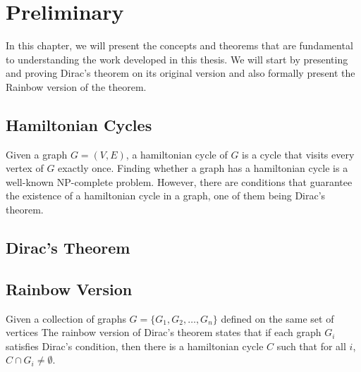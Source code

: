 
\chapter{Preliminary}

In this chapter, we will present the concepts and theorems that are fundamental to understanding the 
work developed in this thesis. We will start by presenting and proving Dirac's theorem on its original
version and also formally present the Rainbow version of the theorem.

\section{Hamiltonian Cycles}

Given a graph $G = (V, E)$, a hamiltonian cycle of $G$ is a cycle that visits every vertex of $G$ exactly once.
Finding whether a graph has a hamiltonian cycle is a well-known NP-complete problem. 
However, there are conditions that guarantee the existence of a hamiltonian cycle in a graph, one of them being Dirac's theorem.

\section{Dirac's Theorem}

\section{Rainbow Version}

Given a collection of graphs  $G = \{G_1, G_2, \ldots, G_n\}$ defined on the same set of vertices
The rainbow version of Dirac's theorem states that if each graph $G_i$ satisfies Dirac's condition, 
then there is a hamiltonian cycle $C$ such that for all $i$, $C \cap G_i \neq \emptyset$.